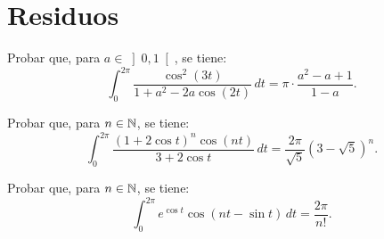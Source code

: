 \section{Residuos}

\begin{ejercicio}
    Probar que, para $a \in \left]0,1\right[$, se tiene:
    \begin{equation*}
        \int_0^{2\pi} \frac{\cos^2(3t)}{1 + a^2 - 2a \cos(2t)} \, dt = \pi\cdot \frac{a^2 - a + 1}{1 - a}.
    \end{equation*}
\end{ejercicio}

\begin{ejercicio}
    Probar que, para $n \in \mathbb{N}$, se tiene:
    \begin{equation*}
        \int_0^{2\pi} \frac{(1 + 2\cos t)^n \cos(nt)}{3 + 2\cos t} \, dt = \dfrac{2\pi}{\sqrt{5}} \left(3 - \sqrt{5}\right)^n.
    \end{equation*}
\end{ejercicio}

\begin{ejercicio}
    Probar que, para $n \in \mathbb{N}$, se tiene:
    \begin{equation*}
        \int_0^{2\pi} e^{\cos t} \cos\left(n t - \sin t\right) \, dt = \frac{2\pi}{n!}.
    \end{equation*}
\end{ejercicio}

